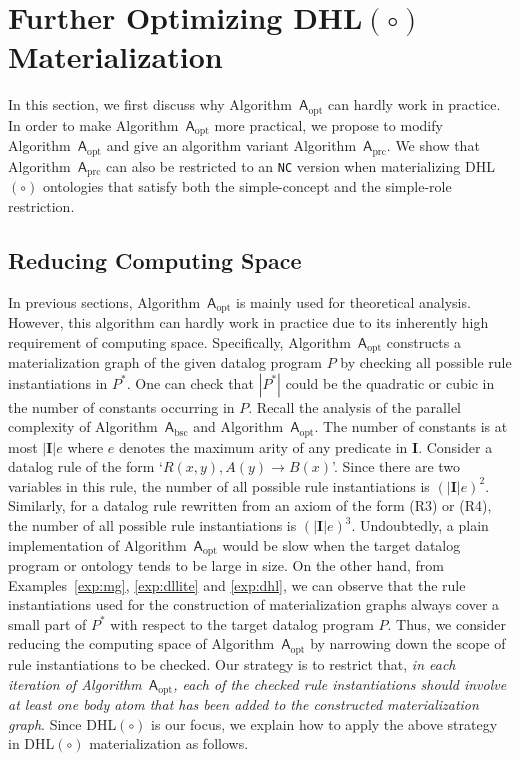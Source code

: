 \section{Further Optimizing DHL$(\circ)$ Materialization}
\label{sec:practicalAlg}

In this section, we first discuss why Algorithm~$\mathsf{A}_{\text{opt}}$ can hardly work in practice.
In order to make Algorithm~$\mathsf{A}_{\text{opt}}$ more practical,
we propose to modify Algorithm~$\mathsf{A}_{\text{opt}}$ and give an algorithm variant Algorithm~$\mathsf{A}_{\text{prc}}$.
We show that Algorithm~$\mathsf{A}_{\text{prc}}$ can also be restricted to an \texttt{NC} version
when materializing DHL$(\circ)$ ontologies that satisfy both the simple-concept
and the simple-role restriction.

\subsection{Reducing Computing Space}

In previous sections, Algorithm~$\mathsf{A}_{\text{opt}}$ is mainly used for theoretical analysis.
However, this algorithm can hardly work in practice due to its inherently
high requirement of computing space. Specifically,
Algorithm~$\mathsf{A}_{\text{opt}}$ constructs a materialization graph of the given
datalog program $P$ by checking all possible rule
instantiations in $P^*$.
One can check that $|P^*|$ could be the quadratic or cubic in the number of constants occurring in $P$.
Recall the analysis of the parallel complexity of Algorithm~$\mathsf{A}_{\text{bsc}}$ and Algorithm~$\mathsf{A}_{\text{opt}}$.
The number of constants is at most $|\textbf{I}|e$ where $e$ denotes the maximum arity of any predicate in $\textbf{I}$.
Consider a datalog rule of the form `$R(x,y),A(y)\rightarrow B(x)$'.
Since there are two variables in this rule, the number of all possible rule instantiations
is $(|\textbf{I}|e)^2$.
Similarly, for a datalog rule rewritten from an axiom of the form (R3) or (R4),
the number of all possible rule instantiations is $(|\textbf{I}|e)^3$.
Undoubtedly, a plain implementation of Algorithm~$\mathsf{A}_{\text{opt}}$ would be slow
when the target datalog program or ontology
tends to be large in size.
On the other hand, from Examples~\ref{exp:mg}, \ref{exp:dllite} and \ref{exp:dhl},
we can observe that the rule instantiations used for the construction
of materialization graphs always cover a small part of $P^*$ with respect to the target datalog program $P$.
Thus, we consider reducing the computing space of Algorithm~$\mathsf{A}_{\text{opt}}$
by narrowing down the scope of rule instantiations to be checked.
Our strategy is to restrict that, \emph{in each iteration of Algorithm~$\mathsf{A}_{\text{opt}}$,
each of the checked rule instantiations should involve at least one body atom that has been
added to the constructed materialization graph}.
Since DHL$(\circ)$
is our focus, we explain how to apply the above strategy in DHL$(\circ)$ materialization
as follows.

